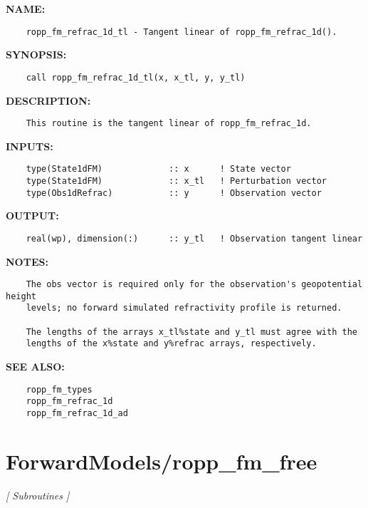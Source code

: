 \label{ch:robo79}
\label{ch:Refractivity_ropp_fm_refrac_1d_tl}
\textbf{NAME:}\hspace{0.08in}\begin{Verbatim}
    ropp_fm_refrac_1d_tl - Tangent linear of ropp_fm_refrac_1d().
\end{Verbatim}
\textbf{SYNOPSIS:}\hspace{0.08in}\begin{Verbatim}
    call ropp_fm_refrac_1d_tl(x, x_tl, y, y_tl)
\end{Verbatim}
\textbf{DESCRIPTION:}\hspace{0.08in}\begin{Verbatim}
    This routine is the tangent linear of ropp_fm_refrac_1d.
\end{Verbatim}
\textbf{INPUTS:}\hspace{0.08in}\begin{Verbatim}
    type(State1dFM)             :: x      ! State vector
    type(State1dFM)             :: x_tl   ! Perturbation vector
    type(Obs1dRefrac)           :: y      ! Observation vector
\end{Verbatim}
\textbf{OUTPUT:}\hspace{0.08in}\begin{Verbatim}
    real(wp), dimension(:)      :: y_tl   ! Observation tangent linear
\end{Verbatim}
\textbf{NOTES:}\hspace{0.08in}\begin{Verbatim}
    The obs vector is required only for the observation's geopotential height 
    levels; no forward simulated refractivity profile is returned.

    The lengths of the arrays x_tl%state and y_tl must agree with the 
    lengths of the x%state and y%refrac arrays, respectively.
\end{Verbatim}
\textbf{SEE ALSO:}\hspace{0.08in}\begin{Verbatim}
    ropp_fm_types
    ropp_fm_refrac_1d
    ropp_fm_refrac_1d_ad
\end{Verbatim}
\section{ForwardModels/ropp\_fm\_free}
\textsl{[ Subroutines ]}


